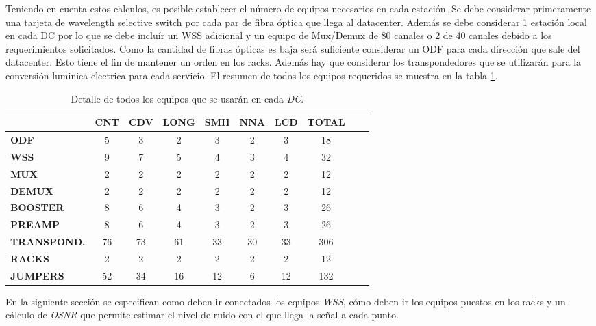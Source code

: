 Teniendo en cuenta estos calculos, es posible establecer el número de equipos necesarios en cada estación. Se debe considerar primeramente una tarjeta de wavelength selective switch por cada par de fibra óptica que llega al datacenter. Además se debe considerar 1 estación local en cada DC por lo que se debe incluír un WSS adicional y un equipo de Mux/Demux de 80 canales o 2 de 40 canales debido a los requerimientos solicitados. Como la cantidad de fibras ópticas es baja será suficiente considerar un ODF para cada dirección que sale del datacenter. Esto tiene el fin de mantener un orden en los racks. Además hay que considerar los transpondedores que se utilizarán para la conversión luminica-electrica para cada servicio. El resumen de todos los equipos requeridos se muestra en la tabla \ref{tab:resumen}.

\begin{table}[!hbt]
\centering
\begin{tabular}{|l | c | c | c | c | c | c | c | c | c |}
\hline 
& \textbf{CNT} & \textbf{CDV} & \textbf{LONG} & \textbf{SMH} & \textbf{NNA} & \textbf{LCD} & \textbf{TOTAL} \\ \hline
\textbf{ODF} & 5 & 3 & 2 & 3 & 2 & 3 & 18 \\
\hline
\textbf{WSS} & 9 & 7 & 5 & 4 & 3 & 4 & 32 \\
\hline
\textbf{MUX} & 2 & 2 & 2 & 2 & 2 & 2 & 12 \\
\hline
\textbf{DEMUX} & 2 & 2 & 2 & 2 & 2 & 2 & 12 \\
\hline
\textbf{BOOSTER} & 8 & 6 & 4 & 3 & 2 & 3 & 26 \\
\hline
\textbf{PREAMP} & 8 & 6 & 4 & 3 & 2 & 3 & 26 \\
\hline
\textbf{TRANSPOND.} & 76 & 73 & 61 & 33 & 30 & 33 & 306 \\
\hline
\textbf{RACKS} & 2 & 2 & 2 & 2 & 2 & 2 & 12 \\
\hline
\textbf{JUMPERS} & 52 & 34 & 16 & 12 & 6 & 12 & 132 \\
\hline
\end{tabular}
\caption[Total de Equipos necesarios]{Detalle de todos los equipos que se usarán en cada \emph{DC}.}
\label{tab:resumen}
\end{table}

En la siguiente sección se especifican como deben ir conectados los equipos \emph{WSS}, cómo deben ir los equipos puestos en los racks y un cálculo de \emph{OSNR} que permite estimar el nivel de ruido con el que llega la señal a cada punto.
